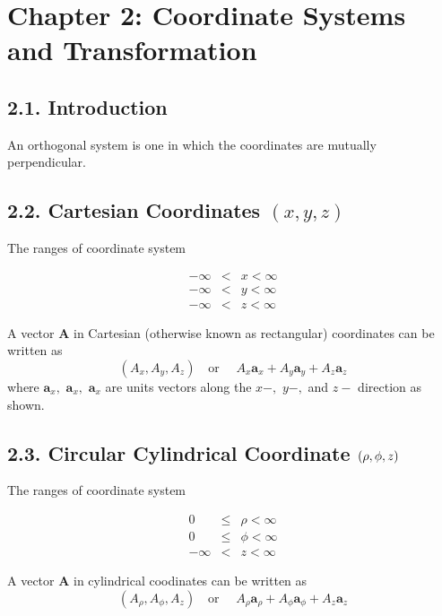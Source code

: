 \documentclass{article}
\begin{document}
\section{\protect\bigskip Chapter 2: Coordinate Systems and Transformation}

\subsection{2.1. Introduction}

An orthogonal system is one in which the coordinates are mutually
perpendicular.

\bigskip

\subsection{2.2. Cartesian Coordinates $(x,y,z)$}

The ranges of coordinate system

\begin{eqnarray*}
-\infty &<&x<\infty \\
-\infty &<&y<\infty \\
-\infty &<&z<\infty
\end{eqnarray*}

A vector $\mathbf{A}$ in Cartesian (otherwise known as rectangular)
coordinates can be written as 
\[
\left( A_{x},A_{y},A_{z}\right) \text{ ~~or ~~~}A_{x}\mathbf{a}_{x}+A_{y}%
\mathbf{a}_{y}+A_{z}\mathbf{a}_{z} 
\]%
where $\mathbf{a}_{x},$ $\mathbf{a}_{x},$ $\mathbf{a}_{x}$ are units vectors
along the $x-,$ $y-,$ and $z-$ direction as shown.

\bigskip

\subsection{2.3. Circular Cylindrical Coordinate $(\protect\rho ,\protect%
\phi ,z)$}

The ranges of coordinate system

\begin{eqnarray*}
0\, &\leq &\rho <\infty \\
0\, &\leq &\phi <\infty \\
-\infty &<&z<\infty
\end{eqnarray*}

A vector $\mathbf{A}$ in cylindrical coodinates can be written as 
\[
\left( A_{\rho },A_{\phi },A_{z}\right) \text{ ~~or ~~~}A_{\rho }\mathbf{a}%
_{\rho }+A_{\phi }\mathbf{a}_{\phi }+A_{z}\mathbf{a}_{z} 
\]
\end{document}

